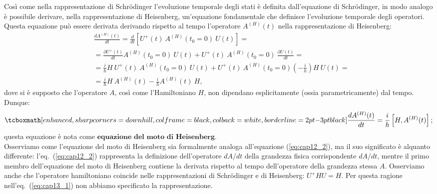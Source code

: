 Così come nella rappresentazione di Schrödinger l'evoluzione temporale degli stati è definita dall'equazione di Schrödinger, in modo analogo è possibile derivare, nella rappresentazione di Heisenberg, un'equazione fondamentale che definisce l'evoluzione temporale degli operatori. Questa equazione può essere derivata derivando rispetto al tempo l'operatore $A^{(H)}(t)$ nella rappresentazione di Heisenberg:
	\begin{align}
		& \frac{dA^{(H)}(t)}{dt} = \frac{d}{dt}\left[U^\textbf{+}(t)\  A^{(H)}(t_0=0)\ U(t)\right] = \nonumber \\
		&= \frac{\partial U^\textbf{+}(t)}{dt} A^{(H)}(t_0=0)\ U(t) + U^\textbf{+}(t)\  A^{(H)}(t_0=0)\ \frac{\partial U(t)}{dt} = \nonumber \\
		&= \frac{i}{\hbar} H\ U^\textbf{+}(t)\ A^{(H)}(t_0=0)\ U(t) + U^\textbf{+}(t)\ A^{(H)}(t_0=0) \left(-\frac{i}{h}\right) H\ U(t) = \nonumber \\
		&= \frac{i}{\hbar} H\ A^{(H)}(t) - \frac{i}{h} A^{(H)}(t)\ H,
	\end{align}
dove si è supposto che l'operatore $A$, così come l'Hamiltoniano $H$, non dipendano esplicitamente (ossia parametricamente) dal tempo. Dunque:
	\begin{equation}
	\label{eq:cap13_1}
		\tcboxmath[enhanced, sharp corners=downhill, colframe=black, colback=white, borderline={2pt}{-3pt}{black}]{
			\frac{d A^{(H)}(t)}{dt} = \frac{i}{h} \left[H, A^{(H)}(t) \right];
			}
	\end{equation}
questa equazione è nota come $\textbf{equazione del moto di Heisenberg}$.\\
 
Osserviamo come l'equazione del moto di Heisenberg sia formalmente analoga all'equazione (\ref{eq:cap12_2}), ma il suo significato è alquanto differente: l'eq.~(\ref{eq:cap12_2}) rappresenta la definizione dell'operatore $dA/dt$ della grandezza fisica corrispondente $dA/dt$, mentre il primo membro dell'equazione del moto di Heisenberg contiene la derivata rispetto al tempo dell'operatore della grandezza stessa $A$. Osserviamo anche che l'operatore hamiltoniano coincide nelle rappresentazioni di Schrödinger e di Heisenberg: $U^\textbf{+} H U = H$. Per questa ragione nell'eq.~(\ref{eq:cap13_1}) non abbiamo specificato la rappresentazione.
